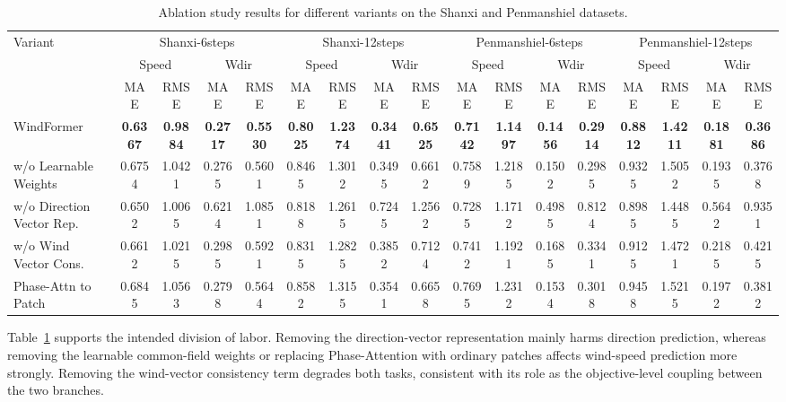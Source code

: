 \begin{table}[htbp]
\caption{Ablation study results for different variants on the Shanxi and Penmanshiel datasets.}
\label{tab:ablation}
\centering
\scriptsize
\setlength{\tabcolsep}{3.2pt}
\renewcommand{\arraystretch}{1.08}
\begin{adjustbox}{max width=\textwidth}
\begin{tabular}{l|cccc|cccc|cccc|cccc}
\toprule
\multirow{3}{*}{Variant}
& \multicolumn{4}{c|}{Shanxi-6steps}
& \multicolumn{4}{c|}{Shanxi-12steps}
& \multicolumn{4}{c|}{Penmanshiel-6steps}
& \multicolumn{4}{c}{Penmanshiel-12steps} \\
\cline{2-17}
& \multicolumn{2}{c}{Speed} & \multicolumn{2}{c|}{Wdir}
& \multicolumn{2}{c}{Speed} & \multicolumn{2}{c|}{Wdir}
& \multicolumn{2}{c}{Speed} & \multicolumn{2}{c|}{Wdir}
& \multicolumn{2}{c}{Speed} & \multicolumn{2}{c}{Wdir} \\
\cline{2-17}
& MAE & RMSE & MAE & RMSE
& MAE & RMSE & MAE & RMSE
& MAE & RMSE & MAE & RMSE
& MAE & RMSE & MAE & RMSE \\
\midrule
WindFormer
& \textbf{0.6367} & \textbf{0.9884} & \textbf{0.2717} & \textbf{0.5530}
& \textbf{0.8025} & \textbf{1.2374} & \textbf{0.3441} & \textbf{0.6525}
& \textbf{0.7142} & \textbf{1.1497} & \textbf{0.1456} & \textbf{0.2914}
& \textbf{0.8812} & \textbf{1.4211} & \textbf{0.1881} & \textbf{0.3686} \\
w/o Learnable Weights
& 0.6754 & 1.0421 & 0.2765 & 0.5601
& 0.8465 & 1.3012 & 0.3495 & 0.6612
& 0.7589 & 1.2185 & 0.1502 & 0.2985
& 0.9325 & 1.5052 & 0.1935 & 0.3768 \\
w/o Direction Vector Rep.
& 0.6502 & 1.0065 & 0.6214 & 1.0851
& 0.8188 & 1.2615 & 0.7245 & 1.2562
& 0.7285 & 1.1712 & 0.4985 & 0.8124
& 0.8985 & 1.4485 & 0.5642 & 0.9351 \\
w/o Wind Vector Cons.
& 0.6612 & 1.0215 & 0.2985 & 0.5921
& 0.8315 & 1.2825 & 0.3852 & 0.7124
& 0.7412 & 1.1921 & 0.1685 & 0.3341
& 0.9125 & 1.4721 & 0.2185 & 0.4215 \\
Phase-Attn to Patch
& 0.6845 & 1.0563 & 0.2798 & 0.5644
& 0.8582 & 1.3155 & 0.3541 & 0.6658
& 0.7695 & 1.2312 & 0.1534 & 0.3018
& 0.9458 & 1.5215 & 0.1972 & 0.3812 \\
\bottomrule
\end{tabular}
\end{adjustbox}
\end{table}

Table~\ref{tab:ablation} supports the intended division of labor. Removing the direction-vector representation mainly harms direction prediction, whereas removing the learnable common-field weights or replacing Phase-Attention with ordinary patches affects wind-speed prediction more strongly. Removing the wind-vector consistency term degrades both tasks, consistent with its role as the objective-level coupling between the two branches.

